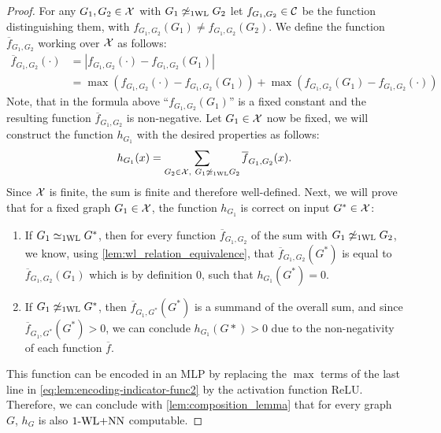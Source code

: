 
\begin{proof}
    For any $G_1, G_2 \in \mathcal{X}$ with $G_1 \not\simeq_{\text{1WL}} G_2$ let $f_{G_1, G_2} \in \mathcal{C}$ be the function distinguishing them, with $f_{G_1, G_2}(G_1) \neq f_{G_1, G_2}(G_2)$. We define the function $\overline{f}_{G_1,G_2}$ working over $\mathcal{X}$ as follows:
    \begin{align}\label{eq:lem:encoding-indicator-func2}
        \overline{f}_{G_1, G_2}(\cdot) &= |f_{G_1, G_2}(\cdot) - f_{G_1, G_2}(G_1)| \nonumber \nonumber\\
        &= \max(f_{G_1, G_2}(\cdot) - f_{G_1, G_2}(G_1)) + \max(f_{G_1, G_2}(G_1) - f_{G_1, G_2}(\cdot))
    \end{align}
    Note, that in the formula above ``$f_{G_1, G_2}(G_1)$'' is a fixed constant and the resulting function $\overline{f}_{G_1, G_2}$ is non-negative.
    Let $G_1 \in \mathcal{X}$ now be fixed, we will construct the function $h_{G_1}$ with the desired properties as follows:
    \begin{align*}
        h_{G_1}(x) = \sum_{G_2 \in \mathcal{X}, \ G_1 \not\simeq_{\text{1WL}} G_2} \overline{f}_{G_1, G_2}(x).
    \end{align*}
    Since $\mathcal{X}$ is finite, the sum is finite and therefore well-defined. Next, we will prove that for a fixed graph $G_1 \in \mathcal{X}$, the function $h_{G_1}$ is correct on input $G^* \in \mathcal{X}$:
    \begin{enumerate}
        \item If $G_1 \simeq_{\text{1WL}} G^*$, then for every function $\overline{f}_{G_1, G_2}$ of the sum with $G_1 \not\simeq_{\text{1WL}} G_2$, we know, using \cref{lem:wl_relation_equivalence}, that $\overline{f}_{G_1, G_2}(G^*)$ is equal to $\overline{f}_{G_1, G_2}(G_1)$ which is by definition $0$, such that $h_{G_1}(G^*) = 0$.
        \item If $G_1 \not\simeq_{\text{1WL}} G^*$, then $\overline{f}_{G_1, G^*}(G^*)$ is a summand of the overall sum, and since $\overline{f}_{G_1, G^*}(G^*) > 0$, 
        we can conclude $h_{G_1}(G*) > 0$ due to the non-negativity of each function $\overline{f}$.
    \end{enumerate}

    This function can be encoded in an MLP by replacing the $\max$ terms of the last line in \autoref{eq:lem:encoding-indicator-func2} by the activation function ReLU. Therefore, we can conclude with \cref{lem:composition_lemma} that for every graph $G$, $h_G$ is also $\text{1-WL+NN}$ computable.
\end{proof}

